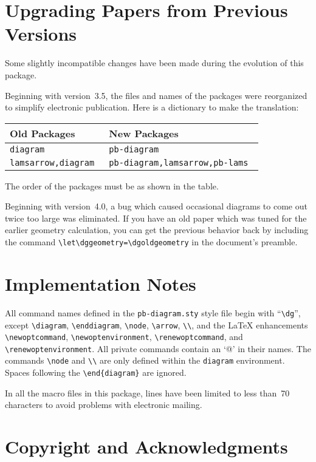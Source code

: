 \documentclass[12pt]{article}\usepackage{pb-diagram}
\begin{document}
\section{Upgrading Papers from Previous Versions}

Some slightly incompatible changes have been made during
the evolution of this package.

Beginning with version~3.5, the files and names of the packages
were reorganized to simplify electronic publication.  Here is a
dictionary to make the translation:
\begin{center}
\begin{tabular}{|l|l|} \hline
   Old Packages & New Packages \\ \hline
   \tt diagram & \tt pb-diagram \\
   \tt lamsarrow,diagram & \tt pb-diagram,lamsarrow,pb-lams \\ \hline
\end{tabular}
\end{center}
The order of the packages must be as shown in the table.

Beginning with version~4.0, a bug which caused occasional diagrams
to come out twice too large was eliminated.  If you have an old paper
which was tuned for the earlier geometry calculation, you can get
the previous behavior back by including the command
\verb"\let\dggeometry=\dgoldgeometry" in the document's preamble.


\section{Implementation Notes}

All command names defined in the \verb"pb-diagram.sty" style file
begin with ``\verb"\dg"'', except \verb"\diagram",
\verb"\enddiagram", \verb"\node", \verb"\arrow",
\verb"\\", and the \LaTeX{} enhancements \verb"\newoptcommand",
\verb"\newoptenvironment", \verb"\renewoptcommand", and
\verb"\renewoptenvironment".  All private commands contain an `@' in
their names.  The commands \verb"\node" and \verb"\\" are only defined 
within the \verb"diagram" environment.  Spaces following the 
\verb"\end{diagram}" are ignored.

In all the macro files in this package, lines have been limited to
less than~70 characters to avoid problems with electronic mailing.


\section{Copyright and Acknowledgments}
\end{document}
